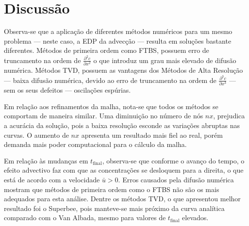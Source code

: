 \chapter{Discussão}

Observa-se que a aplicação de diferentes métodos numéricos para um mesmo
problema --- neste caso, a EDP da advecção --- resulta em soluções bastante
diferentes. Métodos de primeira ordem como FTBS, possuem erro
de truncamento na ordem de $\frac{\partial^2 c}{\partial x^2}$ o que introduz
um grau mais elevado de difusão numérica. Métodos TVD, possuem as vantagens dos
Métodos de Alta Resolução --- baixa difusão numérica, devido ao erro de
truncamento na ordem de $\frac{\partial^3 c}{\partial x^3}$ --- sem os seus
defeitos --- oscilações espúrias.

Em relação aos refinamentos da malha, nota-se que todos os métodos se comportam
de maneira similar. Uma diminuição no número de nós $nx$, prejudica a acurácia
da solução, pois a baixa resolução esconde as variações abruptas nas curvas. O
aumento de $nx$ apresenta um resultado mais fiel ao real, porém demanda mais
poder computacional para o cálculo da malha.

Em relação às mudanças em $t_{\text{final}}$, observa-se que conforme o avanço
do tempo, o efeito advectivo faz com que as concentrações se desloquem para a
direita, o que está de acordo com a velocidade $\bar{u} > 0$. Erros causados
pela difusão numérica mostram que métodos de primeira ordem como o FTBS não são
os mais adequados para esta análise. Dentre os métodos TVD, o que apresentou
melhor resultado foi o Superbee, pois manteve-se mais próximo da curva
analítica comparado com o Van Albada, mesmo para valores de $t_{\text{final}}$
elevados.